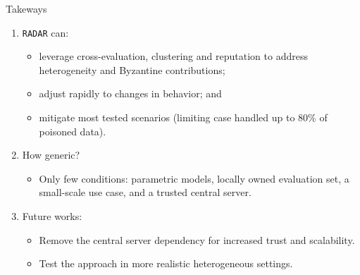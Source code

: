 
\begin{frame}{Takeways}
  \begin{enumerate}
    \item \texttt{RADAR} can:
    \begin{itemize}
      \item leverage \alert{cross-evaluation}, \alert{clustering} and \alert{reputation} to address heterogeneity and Byzantine contributions;
      \item adjust rapidly to changes in behavior; and
      \item mitigate most tested scenarios (limiting case handled up to 80\% of poisoned data).
    \end{itemize}

    \medskip
    \pause
    \item How generic?
    \begin{itemize}
      \item Only few conditions: parametric models, locally owned evaluation set, a \alert<+>{small-scale use case}, and a \alert<+>{trusted central server}.
    \end{itemize}

    \medskip
    \pause
    \item Future works:
    \begin{itemize}
      \item Remove the central server dependency for \alert{increased trust and scalability}.
      \item Test the approach in more realistic heterogeneous settings.
    \end{itemize}
  \end{enumerate}
  



\end{frame}